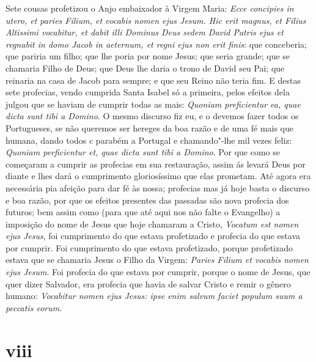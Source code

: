 Sete cousas profetizou o Anjo embaixador à Virgem Maria: \emph{Ecce
concipies in utero, et paries Filium, et vocabis nomen ejus Jesum. Hic
erit magnus, et Filius Altissimi vocabitur, et dabit illi Dominus Deus
sedem David Patris ejus et regnabit in domo Jacob in aeternum, et regni
ejus non erit finis}: que conceberia; que pariria um filho; que lhe
poria por nome Jesus; que seria grande; que se chamaria Filho de Deus;
que Deus lhe daria o trono de David seu Pai; que reinaria na casa de
Jacob para sempre; e que seu Reino não teria fim. E destas sete
profecias, vendo cumprida Santa Isabel só a primeira, pelos efeitos dela
julgou que se haviam de cumprir todas as mais: \emph{Quoniam
preficientur ea, quae dicta sunt tibi a Domino}. O mesmo discurso fiz
eu, e o devemos fazer todos os Portugueses, se não queremos ser hereges
da boa razão e de uma fé mais que humana, dando todos c parabém a
Portugal e chamando"-lhe mil vezes feliz: \emph{Quoniam perficientur et,
quae dicta sunt tibi a Domino}. Por que como se começaram a cumprir as
profecias em sua restauração, assim ás levará Deus por diante e lhes
dará o cumprimento gloriosíssimo que elas prometam. Até agora era
necessária pia afeição para dar fé às nossa; profecias mas já hoje basta
o discurso e boa razão, por que os efeitos presentes das passadas são
nova profecia dos futuros; bem assim como (para que até aqui nos não
falte o Evangelho) a imposição do nome de Jesus que hoje chamaram a
Cristo, \emph{Vocatum est nomen ejus Jesus}, foi cumprimento do que
estava profetizado e profecia do que estava por cumprir. Foi cumprimento
do que estava profetizado, porque profetizado estava que se chamaria
Jesus o Filho da Virgem: \emph{Paries Filium et vocabis nomen ejus
Jesum}. Foi profecia do que estava por cumprir, porque o nome de Jesus,
que quer dizer Salvador, era profecia que havia de salvar Cristo e remir
o gênero humano: \emph{Vocabitur nomen ejus Jesus: ipse enim salvum
faciet populum suum a peccatis eorum}.

\section{viii}

